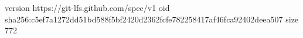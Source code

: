 version https://git-lfs.github.com/spec/v1
oid sha256:c5ef7a1272dd51bd588f5bf2420d2362fcfe782258417af46fca92402deea507
size 772
